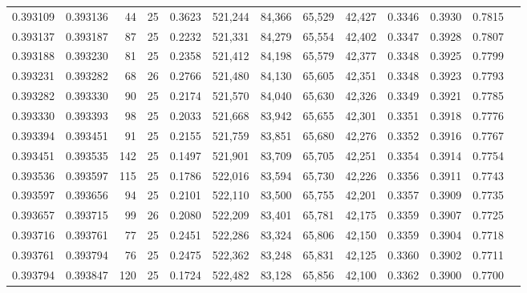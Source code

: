 \begin{tabular}{rrrrrrrrrrrrr}
0.393109 & 0.393136 &    44 &  25 &                                     0.3623 & 521,244 &  84,366 &  65,529 &  42,427 & 0.3346 & 0.3930 & 0.7815 \\
0.393137 & 0.393187 &    87 &  25 &                                     0.2232 & 521,331 &  84,279 &  65,554 &  42,402 & 0.3347 & 0.3928 & 0.7807 \\
0.393188 & 0.393230 &    81 &  25 &                                     0.2358 & 521,412 &  84,198 &  65,579 &  42,377 & 0.3348 & 0.3925 & 0.7799 \\
0.393231 & 0.393282 &    68 &  26 &                                     0.2766 & 521,480 &  84,130 &  65,605 &  42,351 & 0.3348 & 0.3923 & 0.7793 \\
0.393282 & 0.393330 &    90 &  25 &                                     0.2174 & 521,570 &  84,040 &  65,630 &  42,326 & 0.3349 & 0.3921 & 0.7785 \\
0.393330 & 0.393393 &    98 &  25 &                                     0.2033 & 521,668 &  83,942 &  65,655 &  42,301 & 0.3351 & 0.3918 & 0.7776 \\
0.393394 & 0.393451 &    91 &  25 &                                     0.2155 & 521,759 &  83,851 &  65,680 &  42,276 & 0.3352 & 0.3916 & 0.7767 \\
0.393451 & 0.393535 &   142 &  25 &                                     0.1497 & 521,901 &  83,709 &  65,705 &  42,251 & 0.3354 & 0.3914 & 0.7754 \\
0.393536 & 0.393597 &   115 &  25 &                                     0.1786 & 522,016 &  83,594 &  65,730 &  42,226 & 0.3356 & 0.3911 & 0.7743 \\
0.393597 & 0.393656 &    94 &  25 &                                     0.2101 & 522,110 &  83,500 &  65,755 &  42,201 & 0.3357 & 0.3909 & 0.7735 \\
0.393657 & 0.393715 &    99 &  26 &                                     0.2080 & 522,209 &  83,401 &  65,781 &  42,175 & 0.3359 & 0.3907 & 0.7725 \\
0.393716 & 0.393761 &    77 &  25 &                                     0.2451 & 522,286 &  83,324 &  65,806 &  42,150 & 0.3359 & 0.3904 & 0.7718 \\
0.393761 & 0.393794 &    76 &  25 &                                     0.2475 & 522,362 &  83,248 &  65,831 &  42,125 & 0.3360 & 0.3902 & 0.7711 \\
0.393794 & 0.393847 &   120 &  25 &                                     0.1724 & 522,482 &  83,128 &  65,856 &  42,100 & 0.3362 & 0.3900 & 0.7700 \\

\end{tabular}
